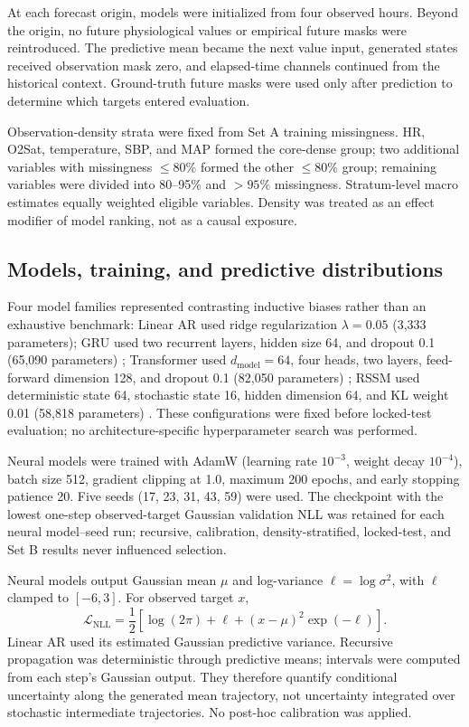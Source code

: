 \documentclass[preprint,12pt]{elsarticle}
\begin{document}
At each forecast origin, models were initialized from four observed hours. Beyond the origin, no future physiological values or empirical future masks were reintroduced. The predictive mean became the next value input, generated states received observation mask zero, and elapsed-time channels continued from the historical context. Ground-truth future masks were used only after prediction to determine which targets entered evaluation.

Observation-density strata were fixed from Set A training missingness. HR, O2Sat, temperature, SBP, and MAP formed the core-dense group; two additional variables with missingness $\leq80\%$ formed the other $\leq80\%$ group; remaining variables were divided into 80--95\% and $>95\%$ missingness. Stratum-level macro estimates equally weighted eligible variables. Density was treated as an effect modifier of model ranking, not as a causal exposure.

\subsection{Models, training, and predictive distributions}

Four model families represented contrasting inductive biases rather than an exhaustive benchmark: Linear AR used ridge regularization $\lambda=0.05$ (3,333 parameters); GRU used two recurrent layers, hidden size 64, and dropout 0.1 (65,090 parameters) \cite{cho2014gru}; Transformer used $d_{\mathrm{model}}=64$, four heads, two layers, feed-forward dimension 128, and dropout 0.1 (82,050 parameters) \cite{vaswani2017attention}; RSSM used deterministic state 64, stochastic state 16, hidden dimension 64, and KL weight 0.01 (58,818 parameters) \cite{hafner2019planet}. These configurations were fixed before locked-test evaluation; no architecture-specific hyperparameter search was performed.

Neural models were trained with AdamW \cite{loshchilov2019adamw} (learning rate $10^{-3}$, weight decay $10^{-4}$), batch size 512, gradient clipping at 1.0, maximum 200 epochs, and early stopping patience 20. Five seeds (17, 23, 31, 43, 59) were used. The checkpoint with the lowest one-step observed-target Gaussian validation NLL was retained for each neural model--seed run; recursive, calibration, density-stratified, locked-test, and Set B results never influenced selection.

Neural models output Gaussian mean $\mu$ and log-variance $\ell=\log\sigma^2$, with $\ell$ clamped to $[-6,3]$. For observed target $x$,
\begin{equation}
\mathcal{L}_{\mathrm{NLL}}=\frac{1}{2}\left[\log(2\pi)+\ell+(x-\mu)^2\exp(-\ell)\right].
\end{equation}
Linear AR used its estimated Gaussian predictive variance. Recursive propagation was deterministic through predictive means; intervals were computed from each step's Gaussian output. They therefore quantify conditional uncertainty along the generated mean trajectory, not uncertainty integrated over stochastic intermediate trajectories. No post-hoc calibration was applied.
\end{document}

